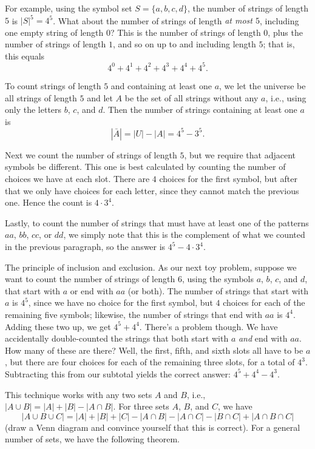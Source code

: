For example, using the symbol set $S = \{a,b,c,d\}$, the number of strings of length $5$
is $|S|^5 = 4^5$. What about the number of strings of length {\it at most $5$}, including
one empty string of length $0$? This is the number of strings of length $0$, plus the number
of strings of length $1$, and so on up to and including length $5$; that is, this equals
$$4^0 + 4^1 + 4^2 + 4^3 + 4^4 + 4^5.$$

To count strings of length $5$ and containing at least one $a$, we let the universe
be all strings of length $5$ and let $A$ be the set of all strings without
any $a$, i.e., using only the letters $b$, $c$, and $d$. Then the number of strings
containing at least one $a$ is
$$|\bar A| = |U| - |A| = 4^5 - 3^5.$$

Next we count the number of strings of length $5$, but we require that adjacent symbols
be different. This one is best calculated by counting the number of choices we have at
each slot. There are $4$ choices for the first symbol, but after
that we only have choices for each letter, since they cannot match the previous one.
Hence the count is $4\cdot 3^4$.

Lastly, to count the number of strings that must have at least one of the patterns
$aa$, $bb$, $cc$, or $dd$, we simply note that this is the complement of what
we counted in the previous paragraph, so the answer is $4^5 - 4\cdot 3^4$.

\medskip\boldlabel The principle of inclusion and exclusion. As our next toy problem,
suppose we want to count the number of strings of length $6$, using the symbols
$a$, $b$, $c$, and $d$, that start with $a$ or end with $aa$ (or both). The number
of strings that start with $a$ is $4^5$, since we have no choice for the first symbol,
but $4$ choices for each of the remaining five symbols; likewise, the number
of strings that end with $aa$ is $4^4$. Adding these two up, we get $4^5+4^4$.
There's a problem though. We have accidentally double-counted the strings that
both start with $a$ {\it and} end with $aa$. How many of these are there? Well, the first, fifth, and
sixth slots all have to be $a$, but there are four choices for each of the remaining
three slots, for a total of $4^3$. Subtracting this from our subtotal yields
the correct answer: $4^5+4^4-4^3$.

This technique works with any two sets $A$ and $B$,
i.e., $|A\cup B| = |A| + |B| - |A\cap B|$. For three sets $A$, $B$, and $C$,
we have
$$|A\cup B\cup C| = |A| + |B| + |C| - |A\cap B| - |A\cap C| - |B\cap C| + |A\cap B\cap C|$$
(draw a Venn diagram and convince yourself that this is correct).
For a general number of sets, we have the following theorem.
\endgroup%

